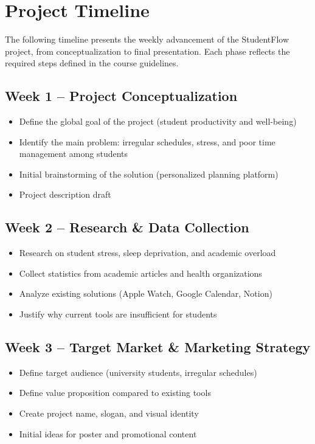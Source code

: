 \documentclass{article}
\begin{document}
\section{Project Timeline}

The following timeline presents the weekly advancement of the StudentFlow project, from conceptualization to final presentation. Each phase reflects the required steps defined in the course guidelines.

\subsection*{Week 1 – Project Conceptualization}
\begin{itemize}
    \item Define the global goal of the project (student productivity and well-being)
    \item Identify the main problem: irregular schedules, stress, and poor time management among students
    \item Initial brainstorming of the solution (personalized planning platform)
    \item Project description draft
\end{itemize}

\subsection*{Week 2 – Research \& Data Collection}
\begin{itemize}
    \item Research on student stress, sleep deprivation, and academic overload
    \item Collect statistics from academic articles and health organizations
    \item Analyze existing solutions (Apple Watch, Google Calendar, Notion)
    \item Justify why current tools are insufficient for students
\end{itemize}

\subsection*{Week 3 – Target Market \& Marketing Strategy}
\begin{itemize}
    \item Define target audience (university students, irregular schedules)
    \item Define value proposition compared to existing tools
    \item Create project name, slogan, and visual identity
    \item Initial ideas for poster and promotional content
\end{itemize}
\end{document}
